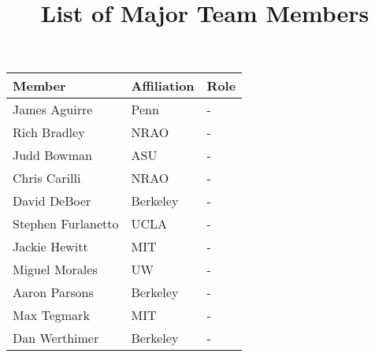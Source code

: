 \documentclass[preprint]{aastex}
\begin{document}
\title{List of Major Team Members}

\begin{tabular}{| p{} |  p{} | p{} |} \hline
\textbf{Member } & \textbf{Affiliation} &  \textbf{Role} \\ \hline
James Aguirre & Penn & - \\ \hline
Rich Bradley & NRAO & - \\ \hline
Judd Bowman & ASU & - \\ \hline
Chris Carilli & NRAO & - \\ \hline
David DeBoer & Berkeley & - \\ \hline
Stephen Furlanetto & UCLA & - \\ \hline
Jackie Hewitt & MIT & - \\ \hline
Miguel Morales & UW & - \\ \hline
Aaron Parsons & Berkeley & - \\ \hline
Max Tegmark & MIT & - \\ \hline
Dan Werthimer & Berkeley & - \\ \hline
\end{tabular}
\end{document}
